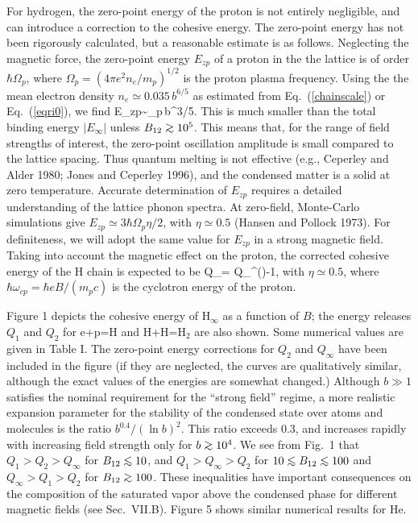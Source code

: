 For hydrogen, the zero-point energy of the proton is not entirely
negligible, and can introduce a correction to the cohesive energy. 
The zero-point energy has not been rigorously calculated, but a reasonable
estimate is as follows. Neglecting the magnetic force,
the zero-point energy $E_{zp}$ of a proton in the the lattice is of order
$\hbar\Omega_p$, where $\Omega_p=(4\pi e^2n_e/m_p)^{1/2}$ 
is the proton plasma frequency. Using the the mean electron density 
$n_e\simeq 0.035\,b^{6/5}$ as estimated from Eq.~(\ref{chainscale}) or
Eq.~(\ref{eqri0}), we find
\be
E_{zp}\sim \hbar\Omega_p\,b^{3/5}.
\ee
This is much smaller than the total binding energy $|E_\infty|$ unless
$B_{12}\go 10^5$. This means that, for the range of field strengths of 
interest, the zero-point oscillation amplitude is small compared to the 
lattice spacing. Thus quantum melting is not effective (e.g., 
Ceperley and Alder 1980; Jones and Ceperley 1996),
and the condensed matter is a solid at zero temperature.
Accurate determination of $E_{zp}$ requires a detailed understanding 
of the lattice phonon spectra. At zero-field, Monte-Carlo simulations give 
$E_{zp}\simeq 3\hbar\Omega_p\eta/2$, with $\eta\simeq 0.5$ 
(Hansen and Pollock 1973). For definiteness, we will adopt the same
value for $E_{zp}$ in a strong magnetic field.
Taking into account the magnetic effect on the proton, the corrected
cohesive energy of the H chain is expected to be 
\be
Q_\infty= Q_\infty^{(\infty)}-{1},
\label{eqqinfty}\ee
with $\eta\simeq 0.5$, where $\hbar\omega_{cp}=\hbar eB/(m_pc)$ 
is the cyclotron energy of the proton.  

Figure 1 depicts the cohesive energy of H$_\infty$ as a function of $B$;
the energy releases $Q_1$ and $Q_2$ for e+p=H and H+H=H$_2$ are also shown.
Some numerical values are given in Table I. The zero-point energy corrections
for $Q_2$ and $Q_\infty$ have been included in the figure (if they are
neglected, the curves are qualitatively similar, although 
the exact values of the energies are somewhat changed.)
Although $b\gg 1$ satisfies the nominal requirement for the
``strong field'' regime, a more realistic expansion
parameter for the stability of the condensed state over atoms
and molecules is the ratio $b^{0.4}/(\ln b)^2$. This ratio exceeds $0.3$, and 
increases rapidly with increasing field strength only for 
$b\go 10^4$. We see from Fig.~1 that $Q_1>Q_2>Q_\infty$ for $B_{12}\lo 10$,
and $Q_1>Q_\infty>Q_2$ for $10\lo B_{12}\lo 100$ and $Q_\infty>Q_1>Q_2$ 
for $B_{12}\go 100$. These inequalities have
important consequences on the composition of the saturated vapor
above the condensed phase for different magnetic fields (see Sec.~VII.B). 
Figure 5 shows similar numerical results for He.

